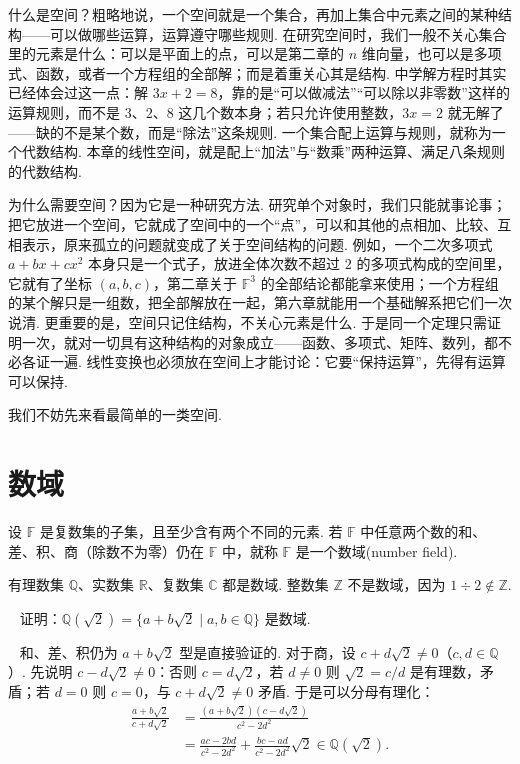 \documentclass[lang=cn,10.5pt,scheme=chinese,toc=twocol,section,chinesefont=nofont,
twoside,citestyle=gb7714-2015,bibstyle=gb7714-2015]{elegantbook}
\DeclareRobustCommand{\textbf}[1]{{\lnsemiboldlatin\lnsemiboldcjk #1}}
\numberwithin{equation}{section}   %
\newcommand*{\lnlabel}[1]{{\sffamily\bfseries\color{black}#1}}
\renewenvironment{example}[1][]{%
	\refstepcounter{exam}%
	\par\noindent\lnlabel{\examplename\ \theexam\ifblank{#1}{}{\ #1}}\ \rmfamily}{%
	\par\ignorespacesafterend}
\renewenvironment{proof}{%
	\par\noindent\lnlabel{\proofname}\;\ \color{black!90}\cfs}{\par}
\begin{document}
什么是空间？粗略地说，一个\textbf{空间}就是一个集合，再加上集合中元素之间的某种\textbf{结构}——可以做哪些运算，运算遵守哪些规则. 在研究空间时，我们一般不关心集合里的元素是什么：可以是平面上的点，可以是第二章的 $n$ 维向量，也可以是多项式、函数，或者一个方程组的全部解；而是着重关心其是结构. 中学解方程时其实已经体会过这一点：解 $3x+2=8$，靠的是“可以做减法”“可以除以非零数”这样的运算规则，而不是 $3$、$2$、$8$ 这几个数本身；若只允许使用整数，$3x=2$ 就无解了——缺的不是某个数，而是“除法”这条规则. 一个集合配上运算与规则，就称为一个\textbf{代数结构}. 本章的线性空间，就是配上“加法”与“数乘”两种运算、满足八条规则的代数结构.

为什么需要空间？因为它是一种研究方法. 研究单个对象时，我们只能就事论事；把它放进一个空间，它就成了空间中的一个“点”，可以和其他的点相加、比较、互相表示，原来孤立的问题就变成了关于空间结构的问题. 例如，一个二次多项式 $a+bx+cx^2$ 本身只是一个式子，放进全体次数不超过 $2$ 的多项式构成的空间里，它就有了坐标 $(a,b,c)$，第二章关于 $\mathbb{F}^3$ 的全部结论都能拿来使用；一个方程组的某个解只是一组数，把全部解放在一起，第六章就能用一个基础解系把它们一次说清. 更重要的是，空间只记住结构，不关心元素是什么. 于是同一个定理只需证明一次，就对一切具有这种结构的对象成立——函数、多项式、矩阵、数列，都不必各证一遍. 线性变换也必须放在空间上才能讨论：它要“保持运算”，先得有运算可以保持.

我们不妨先来看最简单的一类空间.

\section{数域}

\begin{definition}
  设 $\mathbb{F}$ 是复数集的子集，且至少含有两个不同的元素. 若 $\mathbb{F}$ 中任意两个数的和、差、积、商（除数不为零）仍在 $\mathbb{F}$ 中，就称 $\mathbb{F}$ 是一个\textbf{数域}(number field).
\end{definition}

有理数集 $\mathbb{Q}$、实数集 $\mathbb{R}$、复数集 $\mathbb{C}$ 都是数域. 整数集 $\mathbb{Z}$ 不是数域，因为 $1\div 2\notin\mathbb{Z}$.

\begin{example}
  证明：$\mathbb{Q}(\sqrt{2}) = \{ a+b\sqrt{2} \mid a,b \in \mathbb{Q} \}$ 是数域.
\end{example}
\begin{proof}
  和、差、积仍为 $a+b\sqrt2$ 型是直接验证的. 对于商，设 $c+d\sqrt{2}\ne 0$（$c,d\in\mathbb{Q}$）. 先说明 $c-d\sqrt2\neq 0$：否则 $c=d\sqrt2$，若 $d\ne0$ 则 $\sqrt2=c/d$ 是有理数，矛盾；若 $d=0$ 则 $c=0$，与 $c+d\sqrt2\ne0$ 矛盾. 于是可以分母有理化：
  \[
    \begin{aligned}
      \frac{a+b\sqrt{2}}{c+d\sqrt{2}} & =\frac{(a+b\sqrt{2})(c-d\sqrt{2})}{c^2-2d^2}                                  \\
                                      & =\frac{ac-2bd}{c^2-2d^2}+\frac{bc-ad}{c^2-2d^2}\sqrt{2}\in\mathbb{Q}(\sqrt2).
    \end{aligned}
  \]
\end{proof}
\end{document}
